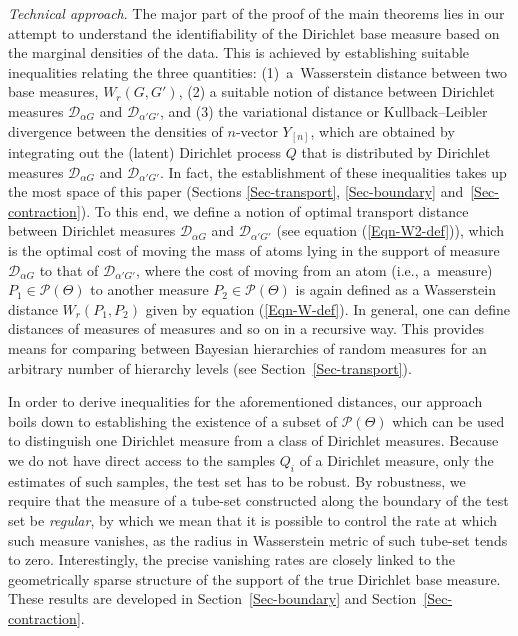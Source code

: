 \documentclass[MSNbibl,number,citesort]{arxbj}
\newcommand{\eqref}[1]{(\ref{#1})}
\newcommand{\Pcal}{\mathscr{P}}
\newcommand{\DP}{\mathscr{D}}
\newcommand{\Wr}{W_r}
\newcommand{\YYn}{Y_{[n]}}
\begin{document}
\textit{Technical approach}.
The major part of the proof of the main theorems
lies in our attempt to understand the identifiability of the
Dirichlet base measure based on the marginal densities of the
data. This is achieved by establishing suitable inequalities
relating the three quantities:
(1)~a~Wasserstein distance between two base measures, $\Wr(G,G')$,
(2) a suitable notion of distance between
Dirichlet measures $\DP_{\alpha G}$ and $\DP_{\alpha'G'}$, and
(3) the variational distance or Kullback--Leibler divergence between
the densities
of $n$-vector $\YYn$,
which are obtained by integrating out the (latent) Dirichlet
process $Q$ that is distributed by Dirichlet measures $\DP_{\alpha G}$
and $\DP_{\alpha' G'}$.
In fact, the establishment of these inequalities takes up the most
space of this paper (Sections \ref{Sec-transport}, \ref{Sec-boundary}
and~\ref{Sec-contraction}).
To this end, we define a notion of optimal transport distance between Dirichlet
measures $\DP_{\alpha G}$ and $\DP_{\alpha' G'}$ (see equation
\eqref
{Eqn-W2-def}),
which is the optimal
cost of moving the mass of atoms lying in the support of measure $\DP
_{\alpha G}$
to that of $\DP_{\alpha' G'}$, where the cost of moving
from an atom (i.e., a~measure) $P_1 \in\Pcal(\Theta)$ to another
measure $P_2 \in\Pcal(\Theta)$
is again defined as a Wasserstein distance $\Wr(P_1,P_2)$ given by
equation \eqref{Eqn-W-def}.
In general, one can define distances of measures of measures and so on
in a recursive way. This provides means for comparing between Bayesian
hierarchies of random measures for an arbitrary number of hierarchy levels
(see Section~\ref{Sec-transport}).

In order to derive inequalities for the aforementioned distances,
our approach boils down to establishing the
existence of a subset of $\Pcal(\Theta)$ which can be used
to distinguish one Dirichlet measure from a class of Dirichlet measures.
Because we do not have direct access to the samples $Q_i$
of a Dirichlet measure,
only the estimates of such samples, the test set has to be robust.
By robustness, we require that the measure of a tube-set constructed along
the boundary of the test set be \emph{regular}, by which we mean
that it is possible to
control the rate at which such measure vanishes, as the radius in Wasserstein
metric of such tube-set tends to zero. Interestingly,
the precise vanishing rates are closely linked to the geometrically
sparse structure of the support of the true Dirichlet base measure.
These results are developed in Section~\ref{Sec-boundary}
and Section~\ref{Sec-contraction}.
\end{document}
